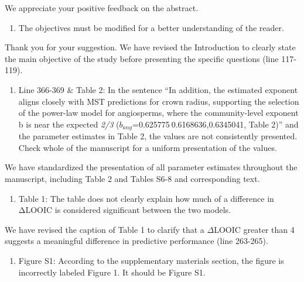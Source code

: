 \documentclass[
  12pt,
  letterpaper,
  DIV=11,
  numbers=noendperiod]{scrartcl}
\providecommand{\tightlist}{%
  \setlength{\itemsep}{0pt}\setlength{\parskip}{0pt}}\usepackage{longtable,booktabs,array}
\renewenvironment{quote}
  {\begin{customblockquote}\color{blockquote-text}\ignorespaces}
  {\end{customblockquote}}
\begin{document}
We appreciate your positive feedback on the abstract.

\begin{quote}
\begin{enumerate}
\def\labelenumi{\arabic{enumi})}
\setcounter{enumi}{2}
\tightlist
\item
  The objectives must be modified for a better understanding of the
  reader.
\end{enumerate}
\end{quote}

Thank you for your suggestion. We have revised the Introduction to
clearly state the main objective of the study before presenting the
specific questions (line 117-119).

\begin{quote}
\begin{enumerate}
\def\labelenumi{\arabic{enumi})}
\setcounter{enumi}{3}
\tightlist
\item
  Line 366-369 \& Table 2: In the sentence ``In addition, the estimated
  exponent aligns closely with MST predictions for crown radius,
  supporting the selection of the power-law model for angiosperms, where
  the community-level exponent b is near the expected \emph{2/3}
  (\(b_{ang}\)=0.625775 0.6168636,0.6345041, Table 2)'' and the
  parameter estimates in Table 2, the values are not consistently
  presented. Check whole of the manuscript for a uniform presentation of
  the values.
\end{enumerate}
\end{quote}

We have standardized the presentation of all parameter estimates
throughout the manuscript, including Table 2 and Tables S6-8 and
corresponding text.

\begin{quote}
\begin{enumerate}
\def\labelenumi{\arabic{enumi})}
\setcounter{enumi}{4}
\tightlist
\item
  Table 1: The table does not clearly explain how much of a difference
  in ΔLOOIC is considered significant between the two models.
\end{enumerate}
\end{quote}

We have revised the caption of Table 1 to clarify that a \(\Delta\)LOOIC
greater than 4 suggests a meaningful difference in predictive
performance (line 263-265).

\begin{quote}
\begin{enumerate}
\def\labelenumi{\arabic{enumi})}
\setcounter{enumi}{5}
\tightlist
\item
  Figure S1: According to the supplementary materials section, the
  figure is incorrectly labeled Figure 1. It should be Figure S1.
\end{enumerate}
\end{quote}
\end{document}

